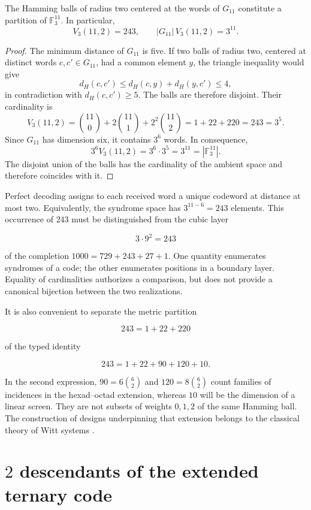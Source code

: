 \begin{theorem}[Perfection of \(G_{11}\)]
\label{thm:g11-perfecto}
The Hamming balls of radius two centered at the words of \(G_{11}\)
constitute a partition of \(\mathbb F_3^{11}\). In particular,
\[
V_3(11,2)=243,
\qquad
|G_{11}|\,V_3(11,2)=3^{11}.
\]
\end{theorem}

\begin{proof}
The minimum distance of \(G_{11}\) is five. If two balls of radius two,
centered at distinct words \(c,c'\in G_{11}\), had a common
element \(y\), the triangle inequality would give
\[
d_H(c,c')\leq d_H(c,y)+d_H(y,c')\leq4,
\]
in contradiction with \(d_H(c,c')\geq5\). The balls are therefore
disjoint. Their cardinality is
\[
V_3(11,2)
=\binom{11}{0}+2\binom{11}{1}+2^2\binom{11}{2}
=1+22+220=243=3^5.
\]
Since \(G_{11}\) has dimension six, it contains \(3^6\) words. In
consequence,
\[
3^6V_3(11,2)=3^6\cdot3^5=3^{11}
=|\mathbb F_3^{11}|.
\]
The disjoint union of the balls has the cardinality of the ambient space and
therefore coincides with it.
\end{proof}

Perfect decoding assigns to each received word a unique codeword
at distance at most two. Equivalently, the syndrome space has
\(3^{11-6}=243\) elements. This occurrence of \(243\) must be
distinguished from the cubic layer

\[
3\cdot9^2=243
\]

of the completion \(1000=729+243+27+1\). One quantity enumerates syndromes of
a code; the other enumerates positions in a boundary layer. Equality
of cardinalities authorizes a comparison, but does not provide a canonical
bijection between the two realizations.

It is also convenient to separate the metric partition

\[
243=1+22+220
\]

of the typed identity

\[
243=1+22+90+120+10.
\]

In the second expression, \(90=6\binom62\) and
\(120=8\binom62\) count families of incidences in the
hexad--octad extension, whereas \(10\) will be the dimension of a linear screen.
They are not subsets of weights \(0,1,2\) of the same Hamming ball.
The construction of designs underpinning that extension belongs to the
classical theory of Witt systems \cite{AssmusKey1992}.

\section{\(2\) descendants of the extended ternary code}
\label{sec:dos-descendientes-cw}

